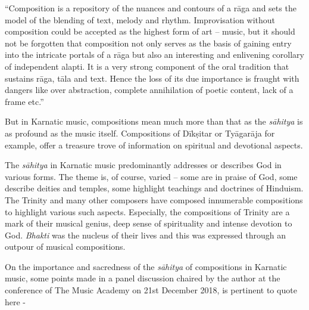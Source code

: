 \begin{myquote}
“Composition is a repository of the nuances and contours of a rāga and sets the model of the blending of text, melody and rhythm. Improvisation without composition could be accepted as the highest form of art – music, but it should not be forgotten that composition not only serves as the basis of gaining entry into the intricate portals of a rāga but also an interesting and enlivening corollary of independent alapti. It is a very strong component of the oral tradition that sustains rāga, tāla and text. Hence the loss of its due importance is fraught with dangers like over abstraction, complete annihilation of poetic content, lack of a frame etc.”
\end{myquote}

But in Karnatic music, compositions mean much more than that as the \textit{sāhitya} is as profound as the music itself. Compositions of Dīkṣitar or Tyāgarāja for example, offer a treasure trove of information on spiritual and devotional aspects.

The \textit{sāhitya} in Karnatic music predominantly addresses or describes God in various forms. The theme is, of course, varied – some are in praise of God, some describe deities and temples, some highlight teachings and doctrines of Hinduism. The Trinity and many other composers have composed innumerable compositions to highlight various such aspects. Especially, the compositions of Trinity are a mark of their musical genius, deep sense of spirituality and intense devotion to God. \textit{Bhakti} was the nucleus of their lives and this was expressed through an outpour of musical compositions.

On the importance and sacredness of the \textit{sāhitya} of compositions in Karnatic music, some points made in a panel discussion chaired by the author at the conference of The Music Academy on 21st December 2018, is pertinent to quote here -

